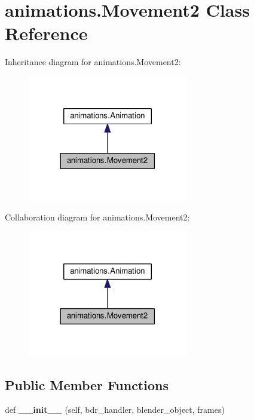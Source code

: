 \hypertarget{classanimations_1_1Movement2}{}\section{animations.\+Movement2 Class Reference}
\label{classanimations_1_1Movement2}


Inheritance diagram for animations.\+Movement2\+:\nopagebreak
\begin{figure}[H]
\begin{center}
\leavevmode
\includegraphics[width=198pt]{classanimations_1_1Movement2__inherit__graph}
\end{center}
\end{figure}


Collaboration diagram for animations.\+Movement2\+:\nopagebreak
\begin{figure}[H]
\begin{center}
\leavevmode
\includegraphics[width=198pt]{classanimations_1_1Movement2__coll__graph}
\end{center}
\end{figure}
\subsection*{Public Member Functions}
\begin{DoxyCompactItemize}
\item 
def {\bfseries \+\_\+\+\_\+init\+\_\+\+\_\+} (self, bdr\+\_\+handler, blender\+\_\+object, frames)\hypertarget{classanimations_1_1Movement2_a7f5da6078530b3041d7bd947a111a2f7}{}\label{classanimations_1_1Movement2_a7f5da6078530b3041d7bd947a111a2f7}

\end{DoxyCompactItemize}
